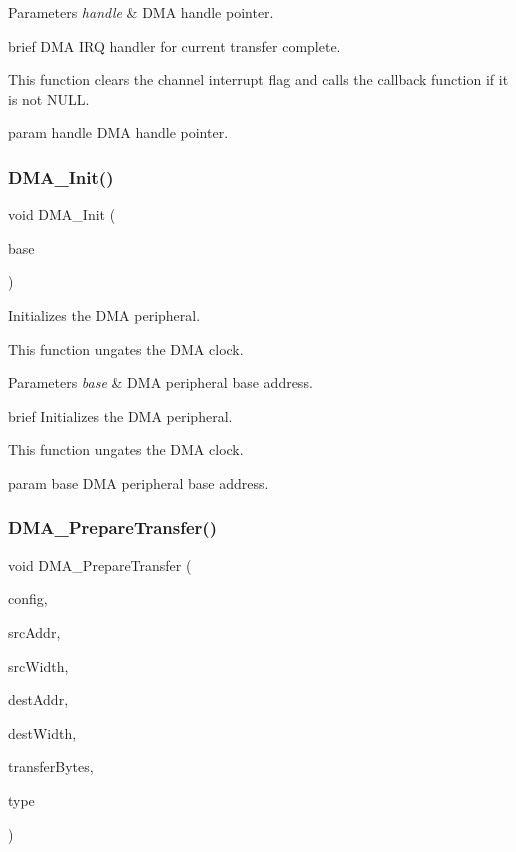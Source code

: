 \begin{DoxyParams}{Parameters}
{\em handle} & D\+MA handle pointer.\\
\hline
\end{DoxyParams}
brief D\+MA I\+RQ handler for current transfer complete.

This function clears the channel interrupt flag and calls the callback function if it is not N\+U\+LL.

param handle D\+MA handle pointer. \mbox{\label{group__dma_gade1b5efa61054ce538b37b181dd075bb}} 
\subsubsection{\texorpdfstring{DMA\_Init()}{DMA\_Init()}}
{\footnotesize\ttfamily void D\+M\+A\+\_\+\+Init (\begin{DoxyParamCaption}\item[{\mbox{\hyperlink{struct_d_m_a___type}{D\+M\+A\+\_\+\+Type}} $\ast$}]{base }\end{DoxyParamCaption})}



Initializes the D\+MA peripheral. 

This function ungates the D\+MA clock.


\begin{DoxyParams}{Parameters}
{\em base} & D\+MA peripheral base address.\\
\hline
\end{DoxyParams}
brief Initializes the D\+MA peripheral.

This function ungates the D\+MA clock.

param base D\+MA peripheral base address. \mbox{\label{group__dma_gaf6e0b93e92a31e0dd3398bce34decb40}} 
\subsubsection{\texorpdfstring{DMA\_PrepareTransfer()}{DMA\_PrepareTransfer()}}
{\footnotesize\ttfamily void D\+M\+A\+\_\+\+Prepare\+Transfer (\begin{DoxyParamCaption}\item[{\mbox{\hyperlink{group__dma_gadb6e4baf9efcf14a889babc34d6f0d80}{dma\+\_\+transfer\+\_\+config\+\_\+t}} $\ast$}]{config,  }\item[{void $\ast$}]{src\+Addr,  }\item[{uint32\+\_\+t}]{src\+Width,  }\item[{void $\ast$}]{dest\+Addr,  }\item[{uint32\+\_\+t}]{dest\+Width,  }\item[{uint32\+\_\+t}]{transfer\+Bytes,  }\item[{\mbox{\hyperlink{group__dma_ga834a242c5bc2fc0fb4cf928616821de0}{dma\+\_\+transfer\+\_\+type\+\_\+t}}}]{type }\end{DoxyParamCaption})}



